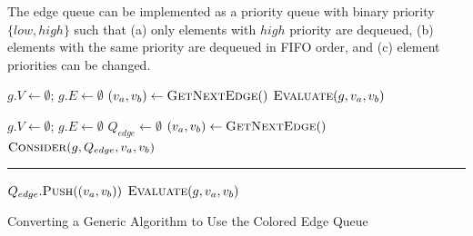 The edge queue can be implemented as a priority queue with
binary priority $\{ low, high \}$
such that
(a) only elements with $high$ priority are dequeued,
(b) elements with the same priority are dequeued in FIFO order,
and (c) element priorities can be changed.

\begin{algorithm}[t]
\begin{widepage}

\begin{minipage}{.43\textwidth}
\begin{algorithmic}[1]
\State $g.V \leftarrow \emptyset$; $g.E \leftarrow \emptyset$
\State
\Loop
\State $(v_a,v_b) \leftarrow \mbox{\textsc{GetNextEdge}}()$
\State $\mbox{\textsc{Evaluate}}(g, v_a, v_b)$%
\EndLoop
\EndProcedure
\end{algorithmic}
\end{minipage}
\;
\begin{minipage}{.55\textwidth}
\begin{algorithmic}[1]
\State $g.V \leftarrow \emptyset$; $g.E \leftarrow \emptyset$
\State $Q_{edge} \leftarrow \emptyset$
\Loop
\State $(v_a,v_b) \leftarrow \mbox{\textsc{GetNextEdge}}()$
\State $\mbox{\textsc{Consider}}(g, Q_{edge}, v_a, v_b)$
\EndLoop
\EndProcedure
\end{algorithmic}
\end{minipage}

\vspace{0.05in}
\rule{\textwidth}{.1pt}%

\begin{algorithmic}[1]
\State $Q_{edge}.\mbox{\textsc{Push}}((v_a, v_b))$
   \label{line:color-check}%
\State $\mbox{\textsc{Evaluate}}(g, v_a, v_b)$%
\EndWhile
\EndProcedure
\end{algorithmic}

\caption{Converting a Generic Algorithm to Use the Colored Edge Queue}
\label{alg:generic-comparison}
\end{widepage}
\end{algorithm}

